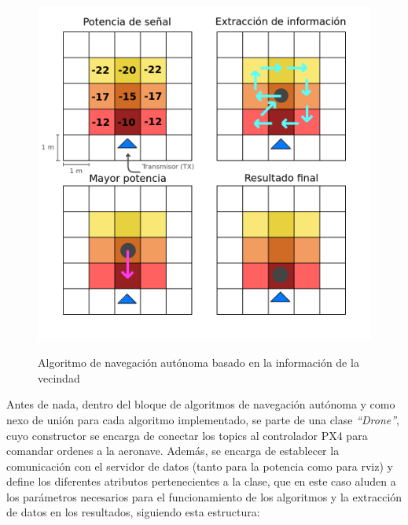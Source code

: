 \begin{figure} [t]
    \begin{center}
    \includegraphics[height=12cm]{imagenes/cap4/9_algoritmo_manual.png}
    \end{center}
    \caption[Algoritmo de navegación autónoma basado en la información de la vecindad]{Algoritmo de navegación autónoma basado en la información de la vecindad}
    \label{fig:manual_algorithm}
\end{figure}

Antes de nada, dentro del bloque de algoritmos de navegación autónoma y como nexo de unión para cada algoritmo implementado, se parte de una clase \emph{``Drone''}, cuyo constructor se encarga de conectar los topics al controlador PX4 para comandar ordenes a la aeronave. Además, se encarga de establecer la comunicación con el servidor de datos (tanto para la potencia como para rviz) y define los diferentes atributos pertenecientes a la clase, que en este caso aluden a los parámetros necesarios para el funcionamiento de los algoritmos y la extracción de datos en los resultados, siguiendo esta estructura:

